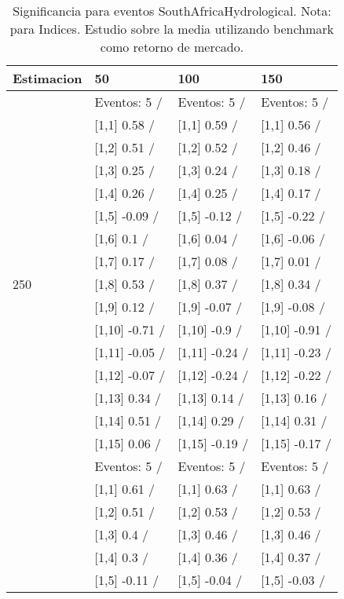 \begin{table}

\caption{Significancia para eventos SouthAfricaHydrological. Nota: para Indices. Estudio sobre la media utilizando benchmark como retorno de mercado.}
\centering
\begin{tabular}[t]{llll}
\toprule
Estimacion & 50 & 100 & 150\\
\midrule
 & Eventos:  5 / & Eventos:  5 / & Eventos:  5 /\\
 & {}[1,1] 0.58  / & {}[1,1] 0.59  / & {}[1,1] 0.56  /\\
 & {}[1,2] 0.51  / & {}[1,2] 0.52  / & {}[1,2] 0.46  /\\
 & {}[1,3] 0.25  / & {}[1,3] 0.24  / & {}[1,3] 0.18  /\\
 & {}[1,4] 0.26  / & {}[1,4] 0.25  / & {}[1,4] 0.17  /\\
\addlinespace
 & {}[1,5] -0.09  / & {}[1,5] -0.12  / & {}[1,5] -0.22  /\\
 & {}[1,6] 0.1  / & {}[1,6] 0.04  / & {}[1,6] -0.06  /\\
 & {}[1,7] 0.17  / & {}[1,7] 0.08  / & {}[1,7] 0.01  /\\
250 & {}[1,8] 0.53  / & {}[1,8] 0.37  / & {}[1,8] 0.34  /\\
 & {}[1,9] 0.12  / & {}[1,9] -0.07  / & {}[1,9] -0.08  /\\
\addlinespace
 & {}[1,10] -0.71  / & {}[1,10] -0.9  / & {}[1,10] -0.91  /\\
 & {}[1,11] -0.05  / & {}[1,11] -0.24  / & {}[1,11] -0.23  /\\
 & {}[1,12] -0.07  / & {}[1,12] -0.24  / & {}[1,12] -0.22  /\\
 & {}[1,13] 0.34  / & {}[1,13] 0.14  / & {}[1,13] 0.16  /\\
 & {}[1,14] 0.51  / & {}[1,14] 0.29  / & {}[1,14] 0.31  /\\
\addlinespace
 & {}[1,15] 0.06  / & {}[1,15] -0.19  / & {}[1,15] -0.17  /\\
 & Eventos:  5 / & Eventos:  5 / & Eventos:  5 /\\
 & {}[1,1] 0.61  / & {}[1,1] 0.63  / & {}[1,1] 0.63  /\\
 & {}[1,2] 0.51  / & {}[1,2] 0.53  / & {}[1,2] 0.53  /\\
 & {}[1,3] 0.4  / & {}[1,3] 0.46  / & {}[1,3] 0.46  /\\
\addlinespace
 & {}[1,4] 0.3  / & {}[1,4] 0.36  / & {}[1,4] 0.37  /\\
 & {}[1,5] -0.11  / & {}[1,5] -0.04  / & {}[1,5] -0.03  /\\

\end{tabular}
\end{table}
